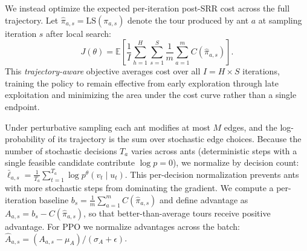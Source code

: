 \documentclass[sigconf]{acmart}
\begin{document}
We instead optimize the expected per-iteration post-SRR cost across the full trajectory.
Let $\hat{\pi}_{a,s} = \mathrm{LS}(\pi_{a,s})$ denote the tour produced by ant $a$ at sampling iteration $s$ after local search:
\begin{equation}
J(\theta) = \mathbb{E} \left[ \frac{1}{I} \sum_{h=1}^H \sum_{s=1}^S \frac{1}{m} \sum_{a=1}^m C(\hat{\pi}_{a,s}) \right].
\end{equation}
This \emph{trajectory-aware} objective averages cost over all $I = H \times S$ iterations, training the policy to remain effective from early exploration through late exploitation and minimizing the area under the cost curve rather than a single endpoint.

Under perturbative sampling each ant modifies at most $M$ edges, and the log-probability of its trajectory is the sum over stochastic edge choices.
Because the number of stochastic decisions $T_a$ varies across ants (deterministic steps with a single feasible candidate contribute $\log p = 0$), we normalize by decision count: $\bar{\ell}_{a,s} = \frac{1}{T_a} \sum_{t=1}^{T_a} \log p^\theta(v_t \mid u_t)$.
This per-decision normalization prevents ants with more stochastic steps from dominating the gradient.
We compute a per-iteration baseline $b_s = \frac{1}{m}\sum_{a=1}^{m} C(\hat{\pi}_{a,s})$ and define advantage as $A_{a,s} = b_s - C(\hat{\pi}_{a,s})$, so that better-than-average tours receive positive advantage.
For PPO we normalize advantages across the batch: $\hat{A}_{a,s} = (A_{a,s} - \mu_A) / (\sigma_A + \epsilon)$.
\end{document}
